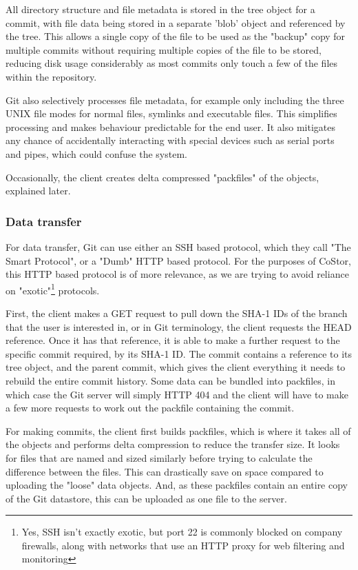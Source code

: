 \documentclass[bsc,frontabs,twoside,singlespacing,parskip,deptreport]{infthesis}     %
\begin{document}
All directory structure and file metadata is stored in the tree object for a commit, with file data
being stored in a separate 'blob' object and referenced by the tree. This allows a single copy 
of the file to be used as the "backup" copy for multiple commits without requiring multiple
copies of the file to be stored, reducing disk usage considerably as most commits only touch a few
of the files within the repository.

Git also selectively processes file metadata, for example only including the three UNIX file modes for
normal files, symlinks and executable files. This simplifies processing and makes behaviour 
predictable for the end user. It also mitigates any chance of accidentally interacting with special
devices such as serial ports and pipes, which could confuse the system.

Occasionally, the client creates delta compressed "packfiles" of the objects, explained later.

\subsubsection{Data transfer}

For data transfer, Git can use either an SSH based protocol, which they call "The Smart Protocol",
or a "Dumb" HTTP based protocol. For the purposes of CoStor, this HTTP based protocol is of more
relevance, as we are trying to avoid reliance on "exotic"\footnote{Yes, SSH isn't exactly exotic, but port 22 is commonly blocked on company firewalls, along with networks that use an HTTP proxy for web filtering and monitoring} 
protocols.

First, the client makes a GET request to pull down the SHA-1 IDs of the branch that the user
is interested in, or in Git terminology, the client requests the HEAD reference. Once it has
that reference, it is able to make a further request to the specific commit required, by its
SHA-1 ID. The commit contains a reference to its tree object, and the parent commit, which gives
the client everything it needs to rebuild the entire commit history. Some data can be bundled into
packfiles, in which case the Git server will simply HTTP 404 and the client will have to make a 
few more requests to work out the packfile containing the commit.

For making commits, the client first builds packfiles, which is where it takes all of the objects and 
performs delta compression to reduce the transfer size. It looks for files that are named and sized 
similarly before trying to calculate the difference between the files. This can drastically save on 
space compared to uploading the "loose" data objects. And, as these packfiles contain an entire 
copy of the Git datastore, this can be uploaded as one file to the server.
\end{document}
